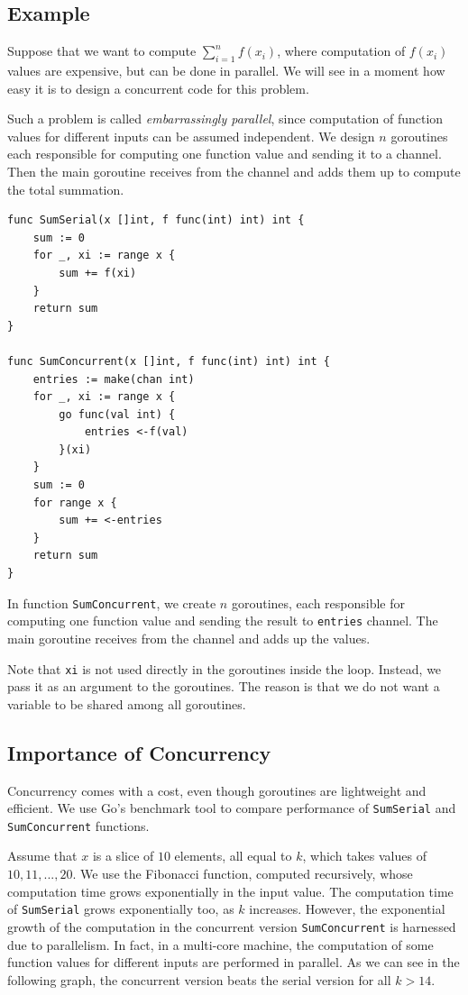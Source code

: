 \documentclass[11pt]{article}
\begin{document}
\subsection*{Example}
\label{sec:orgheadline4}
Suppose that we want to compute \(\sum_{i=1}^nf(x_i)\), where computation of \(f(x_i)\) values are expensive, but can be done in parallel. We will see in a moment how easy it is to design a concurrent code for this problem.

Such a problem is called \emph{embarrassingly parallel}, since computation of function values for different inputs can be assumed independent. We design \(n\) goroutines each responsible for computing one function value and sending it to a channel. Then the main goroutine receives from the channel and adds them up to compute the total summation.

\begin{verbatim}
func SumSerial(x []int, f func(int) int) int {
    sum := 0
    for _, xi := range x {
        sum += f(xi)
    }
    return sum
}

func SumConcurrent(x []int, f func(int) int) int {
    entries := make(chan int)
    for _, xi := range x {
        go func(val int) {
            entries <-f(val)
        }(xi)
    }
    sum := 0
    for range x {
        sum += <-entries
    }
    return sum
}
\end{verbatim}
In function \texttt{SumConcurrent}, we create \(n\) goroutines, each responsible for computing one function value and sending the result to \texttt{entries} channel. The main goroutine receives from the channel and adds up the values.

Note that \texttt{xi} is not used directly in the goroutines inside the loop. Instead, we pass it as an argument to the goroutines. The reason is that we do not want a variable to be shared among all goroutines.

\subsection*{Importance of Concurrency}
\label{sec:orgheadline5}
Concurrency comes with a cost, even though goroutines are lightweight and efficient. We use Go's benchmark tool to compare performance of \texttt{SumSerial} and \texttt{SumConcurrent} functions.

Assume that \(x\) is a slice of \(10\) elements, all equal to \(k\), which takes values of \(10,11,...,20\). We use the Fibonacci function, computed recursively, whose computation time grows exponentially in the input value. The computation time of \texttt{SumSerial} grows exponentially too, as \(k\) increases. However, the exponential growth of the computation in the concurrent version \texttt{SumConcurrent} is harnessed due to parallelism. In fact, in a multi-core machine, the computation of some function values for different inputs are performed in parallel. As we can see in the following graph, the concurrent version beats the serial version for all \(k > 14\).
\end{document}
